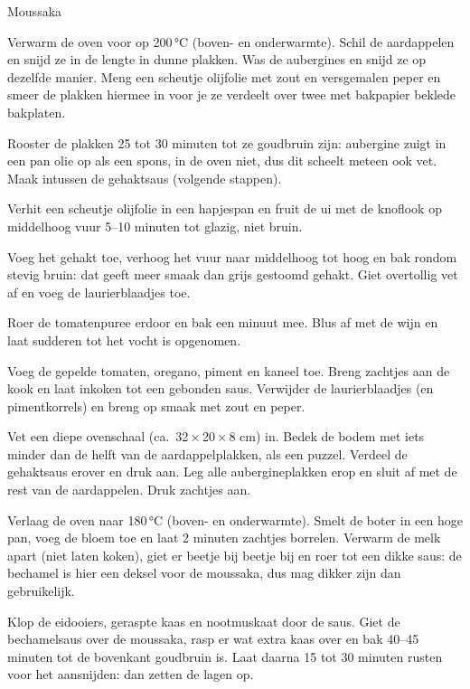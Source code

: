 \begin{recipe}{Moussaka}
\begin{steps}
  \item Verwarm de oven voor op 200\,°C (boven- en onderwarmte). Schil de aardappelen
        en snijd ze in de lengte in dunne plakken. Was de aubergines en snijd ze op
        dezelfde manier. Meng een scheutje olijfolie met zout en versgemalen peper
        en smeer de plakken hiermee in voor je ze verdeelt over twee met bakpapier
        beklede bakplaten.
  \item Rooster de plakken 25 tot 30 minuten tot ze goudbruin zijn: aubergine zuigt
        in een pan olie op als een spons, in de oven niet, dus dit scheelt meteen
        ook vet. Maak intussen de gehaktsaus (volgende stappen).
  \item Verhit een scheutje olijfolie in een hapjespan en fruit de ui met de knoflook
        op middelhoog vuur 5--10 minuten tot glazig, niet bruin.
  \item Voeg het gehakt toe, verhoog het vuur naar middelhoog tot hoog en bak
        rondom stevig bruin: dat geeft meer smaak dan grijs gestoomd gehakt.
        Giet overtollig vet af en voeg de laurierblaadjes toe.
  \item Roer de tomatenpuree erdoor en bak een minuut mee. Blus af met de wijn en
        laat sudderen tot het vocht is opgenomen.
  \item Voeg de gepelde tomaten, oregano, piment en kaneel toe. Breng zachtjes aan
        de kook en laat inkoken tot een gebonden saus. Verwijder de laurierblaadjes
        (en pimentkorrels) en breng op smaak met zout en peper.
  \item Vet een diepe ovenschaal (ca.\ 32\,×\,20\,×\,8 cm) in. Bedek de bodem met
        iets minder dan de helft van de aardappelplakken, als een puzzel. Verdeel
        de gehaktsaus erover en druk aan. Leg alle aubergineplakken erop en sluit
        af met de rest van de aardappelen. Druk zachtjes aan.
  \item Verlaag de oven naar 180\,°C (boven- en onderwarmte). Smelt de boter
        in een hoge pan, voeg de bloem toe en laat 2 minuten zachtjes borrelen.
        Verwarm de melk apart (niet laten koken), giet er beetje bij beetje
        bij en roer tot een dikke saus: de bechamel is hier een deksel voor de
        moussaka, dus mag dikker zijn dan gebruikelijk.
  \item Klop de eidooiers, geraspte kaas en nootmuskaat door de saus. Giet de
        bechamelsaus over de moussaka, rasp er wat extra kaas over en bak
        40--45 minuten tot de bovenkant goudbruin is. Laat daarna 15 tot 30
        minuten rusten voor het aansnijden: dan zetten de lagen op.
\end{steps}
\end{recipe}

